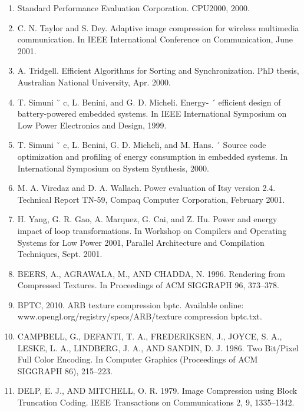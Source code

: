 \documentclass{article}
\begin{document}
\begin{enumerate}
	\item Standard Performance Evaluation Corporation.
	CPU2000, 2000.

	\item C. N. Taylor and S. Dey. Adaptive image compression
	for wireless multimedia communication. In IEEE International Conference on Communication, June 2001.

	\item A. Tridgell. Efficient Algorithms for Sorting and Synchronization. PhD thesis, Australian National University,
	Apr. 2000.

	\item T. Simuni ˘ c, L. Benini, and G. D. Micheli. Energy- ´
	efficient design of battery-powered embedded systems.
	In IEEE International Symposium on Low Power Electronics and Design, 1999.

	\item T. Simuni ˘ c, L. Benini, G. D. Micheli, and M. Hans. ´
	Source code optimization and profiling of energy consumption in embedded systems. In International Symposium on System Synthesis, 2000.

	\item M. A. Viredaz and D. A. Wallach. Power evaluation of
	Itsy version 2.4. Technical Report TN-59, Compaq Computer Corporation, February 2001.

	\item H. Yang, G. R. Gao, A. Marquez, G. Cai, and Z. Hu.
	Power and energy impact of loop transformations. In
	Workshop on Compilers and Operating Systems for
	Low Power 2001, Parallel Architecture and Compilation
	Techniques, Sept. 2001.
	
	\item BEERS, A., AGRAWALA, M., AND CHADDA, N. 1996. Rendering
	from Compressed Textures. In Proceedings of ACM SIGGRAPH
	96, 373–378.

	\item BPTC, 2010. ARB texture compression bptc. Available online:
	www.opengl.org/registry/specs/ARB/texture compression bptc.txt.

	\item CAMPBELL, G., DEFANTI, T. A., FREDERIKSEN, J., JOYCE,
	S. A., LESKE, L. A., LINDBERG, J. A., AND SANDIN, D. J.
	1986. Two Bit/Pixel Full Color Encoding. In Computer Graphics (Proceedings of ACM SIGGRAPH 86), 215–223.
	
	\item DELP, E. J., AND MITCHELL, O. R. 1979. Image Compression
	using Block Truncation Coding. IEEE Transactions on Communications 2, 9, 1335–1342.


\end{enumerate}
\end{document}

